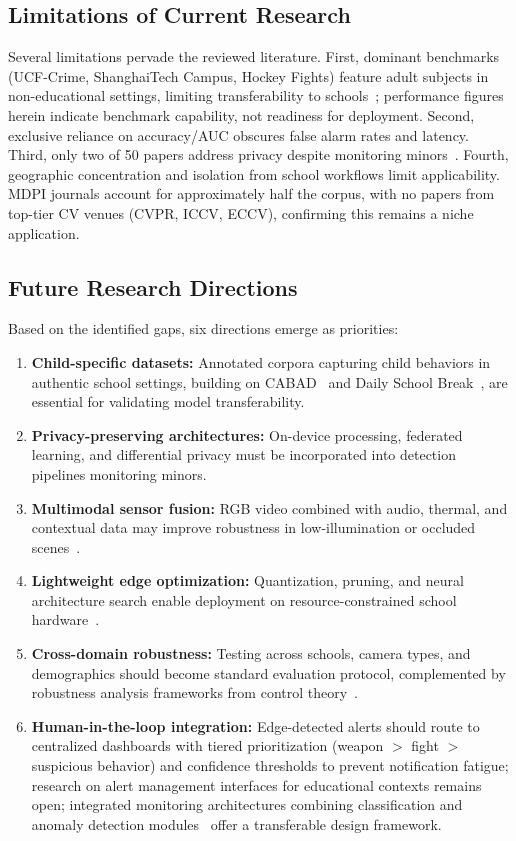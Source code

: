 \documentclass[conference]{IEEEtran}
\begin{document}
\subsection{Limitations of Current Research}

Several limitations pervade the reviewed literature. First, dominant benchmarks (UCF-Crime, ShanghaiTech Campus, Hockey Fights) feature adult subjects in non-educational settings, limiting transferability to schools~\cite{b15}; performance figures herein indicate benchmark capability, not readiness for deployment. Second, exclusive reliance on accuracy/AUC obscures false alarm rates and latency. Third, only two of 50 papers address privacy despite monitoring minors~\cite{b11}. Fourth, geographic concentration and isolation from school workflows limit applicability. MDPI journals account for approximately half the corpus, with no papers from top-tier CV venues (CVPR, ICCV, ECCV), confirming this remains a niche application.

\subsection{Future Research Directions}

Based on the identified gaps, six directions emerge as priorities:
\begin{enumerate}
\item \textbf{Child-specific datasets:} Annotated corpora capturing child behaviors in authentic school settings, building on CABAD~\cite{b15} and Daily School Break~\cite{b11}, are essential for validating model transferability.
\item \textbf{Privacy-preserving architectures:} On-device processing, federated learning, and differential privacy must be incorporated into detection pipelines monitoring minors.
\item \textbf{Multimodal sensor fusion:} RGB video combined with audio, thermal, and contextual data may improve robustness in low-illumination or occluded scenes~\cite{b21,b22}.
\item \textbf{Lightweight edge optimization:} Quantization, pruning, and neural architecture search enable deployment on resource-constrained school hardware~\cite{b7,b23}.
\item \textbf{Cross-domain robustness:} Testing across schools, camera types, and demographics should become standard evaluation protocol, complemented by robustness analysis frameworks from control theory~\cite{b25}.
\item \textbf{Human-in-the-loop integration:} Edge-detected alerts should route to centralized dashboards with tiered prioritization (weapon $>$ fight $>$ suspicious behavior) and confidence thresholds to prevent notification fatigue; research on alert management interfaces for educational contexts remains open; integrated monitoring architectures combining classification and anomaly detection modules~\cite{b24} offer a transferable design framework.
\end{enumerate}
\end{document}
